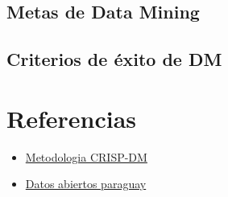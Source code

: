 \documentclass[12pt, letterpaper, spanish]{article}
\begin{document}
\subsection{Metas de Data Mining}
\subsection{Criterios de éxito de DM}
\section{Referencias}
\begin{itemize}
    \item \href{https://www.sngular.com/es/crisp-dm-fase-i-comprension-del-negocio/?authuser=0}{Metodologia CRISP-DM}
    \item \href{https://www.datos.gov.py/search/type/dataset}{Datos abiertos paraguay}
\end{itemize}
\end{document}
